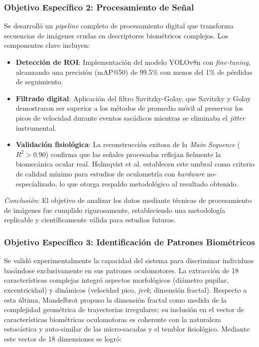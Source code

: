 \subsubsection{Objetivo Específico 2: Procesamiento de Señal}

Se desarrolló un \textit{pipeline} completo de procesamiento digital que transforma secuencias de imágenes crudas en descriptores biométricos complejos.
Los componentes clave incluyen:

\begin{itemize}
	\item \textbf{Detección de ROI}: Implementación del modelo YOLOv8n con \textit{fine-tuning}, alcanzando una precisión (mAP@50) de 99.5\% con menos del 1\% de pérdidas de seguimiento.
	\item \textbf{Filtrado digital}: Aplicación del filtro Savitzky-Golay, que Savitzky y Golay \cite{savitzky1964smoothing} demostraron ser superior a los métodos de promedio móvil al preservar los picos de velocidad durante eventos sacádicos mientras se eliminaba el \textit{jitter} instrumental.
	\item \textbf{Validación fisiológica}: La reconstrucción exitosa de la \textit{Main Sequence} ($R^2 > 0.90$) confirma que las señales procesadas reflejan fielmente la biomecánica ocular real.
	Holmqvist et al. \cite{holmqvist2011eye} establecen este umbral como criterio de calidad mínimo para estudios de oculometría con \textit{hardware} no-especializado, lo que otorga respaldo metodológico al resultado obtenido.
\end{itemize}

\textit{Conclusión}: El objetivo de analizar los datos mediante técnicas de procesamiento de imágenes fue cumplido rigurosamente, estableciendo una metodología replicable y científicamente válida para estudios futuros.
\subsubsection{Objetivo Específico 3: Identificación de Patrones Biométricos}

Se validó experimentalmente la capacidad del sistema para discriminar individuos basándose exclusivamente en sus patrones oculomotores.
La extracción de 18 características complejas integró aspectos morfológicos (diámetro pupilar, excentricidad) y dinámicos (velocidad pico, \textit{jerk}, dimensión fractal).
Respecto a esta última, Mandelbrot \cite{mandelbrot1982fractal} propuso la dimensión fractal como medida de la complejidad geométrica de trayectorias irregulares;
su inclusión en el vector de características biométricas oculomotoras es coherente con la naturaleza estocástica y auto-similar de las micro-sacadas y el temblor fisiológico.
Mediante este vector de 18 dimensiones se logró:

